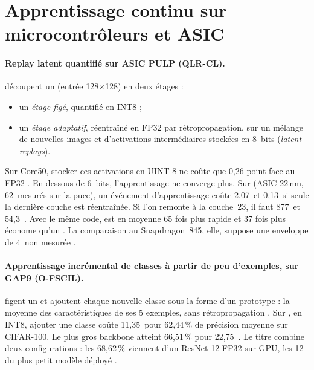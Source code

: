 \section{Apprentissage continu sur microcontrôleurs et ASIC}
\label{sec:cl-mcu}

\paragraph{Replay latent quantifié sur ASIC PULP (QLR-CL).}
\citet{arxiv-2110.10486-tinyml-platform-device-continual-learning} découpent un 
(entrée 128$\times$128) en deux étages  :
\begin{itemize}
  \item un \emph{étage figé}, quantifié en INT8 ;
  \item un \emph{étage adaptatif}, réentraîné en FP32 par rétropropagation, sur un mélange
    de nouvelles images et d'activations intermédiaires stockées en 8~bits (\emph{latent
    replays}).
\end{itemize}
Sur Core50, stocker ces activations en UINT-8 ne coûte que 0,26 point face au FP32
. En dessous de 6~bits, l'apprentissage ne converge plus. Sur  (ASIC 22\,nm,
62\, mesurés sur la puce), un événement d'apprentissage coûte 2,07\, et 0,13\, si seule
la dernière couche est réentraînée. Si l'on remonte à la couche~23, il faut 877\, et
54,3\, . Avec le même code,  est en moyenne 65 fois plus rapide et 37
fois plus économe qu'un  . La comparaison au Snapdragon~845, elle, suppose
une enveloppe de 4\, non mesurée .

\paragraph{Apprentissage incrémental de classes à partir de peu d'exemples, sur GAP9
(O-FSCIL).} \citet{arxiv-2403.07851-12-mj-per-class-device} figent un  et
ajoutent chaque nouvelle classe sous la forme d'un prototype : la moyenne des
caractéristiques de ses 5 exemples, sans rétropropagation . Sur , en
INT8, ajouter une classe coûte 11,35\, pour 62,44\,\% de précision moyenne sur
CIFAR-100. Le plus gros backbone atteint 66,51\,\% pour 22,75\, .
Le titre combine deux configurations : les 68,62\,\% viennent d'un ResNet-12 FP32 sur GPU,
les 12\, du plus petit modèle déployé .

